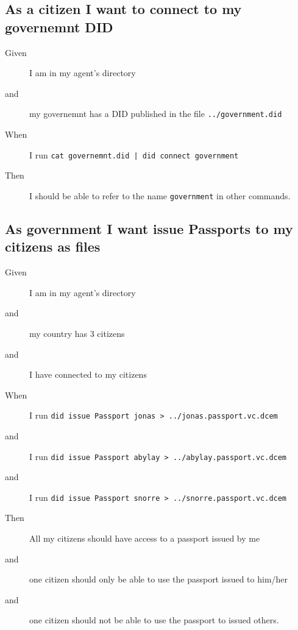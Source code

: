 \subsection{As a citizen I want to connect to my governemnt DID}
\begin{description}\begin{description}
    \item[Given] I am in my agent's directory
    \item[and] my governemnt has a DID published in the file \texttt{../government.did}
    \item[When] I run \texttt{cat governemnt.did | did connect government}
    \item[Then] I should be able to refer to the name \texttt{government} in other commands.
\end{description}\end{description}



\subsection{As government I want issue Passports to my citizens as files}
\begin{description}\begin{description}
    \item[Given] I am in my agent's directory
    \item[and] my country has 3 citizens 
    \item[and] I have connected to my citizens
    \item[When] I run \texttt{did issue Passport jonas > ../jonas.passport.vc.dcem}
    \item[and] I run \texttt{did issue Passport abylay > ../abylay.passport.vc.dcem}
    \item[and] I run \texttt{did issue Passport snorre > ../snorre.passport.vc.dcem}
    \item[Then] All my citizens should have access to a passport issued by me
    \item[and] one citizen should only be able to use the passport issued to him/her
    \item[and] one citizen should not be able to use the passport to issued others.
\end{description}\end{description}



